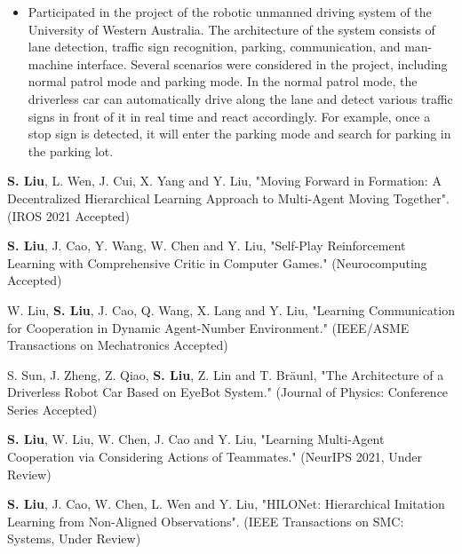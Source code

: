 {\small
  \begin{itemize}
    \item Participated in the project of the robotic unmanned driving system of the University of Western Australia. The architecture of the system consists of lane detection, traffic sign recognition, parking, communication, and man-machine interface. Several scenarios were considered in the project, including normal patrol mode and parking mode. In the normal patrol mode, the driverless car can automatically drive along the lane and detect various traffic signs in front of it in real time and react accordingly. For example, once a stop sign is detected, it will enter the parking mode and search for parking in the parking lot.
  \end{itemize}
}


\begin{itemize}[leftmargin=*]
  {\small
  \item
  \textbf{S. Liu}, L. Wen, J. Cui, X. Yang and Y. Liu, "Moving Forward in Formation: A Decentralized Hierarchical Learning Approach to Multi-Agent Moving Together". (IROS 2021 Accepted)
  \item
  \textbf{S. Liu}, J. Cao, Y. Wang, W. Chen and Y. Liu, "Self-Play Reinforcement Learning with Comprehensive Critic in Computer Games." (Neurocomputing Accepted)
  \item
  W. Liu, \textbf{S. Liu}, J. Cao, Q. Wang, X. Lang and Y. Liu, "Learning Communication for Cooperation in Dynamic Agent-Number Environment." (IEEE/ASME Transactions on Mechatronics Accepted)
  \item 
  S. Sun, J. Zheng, Z. Qiao, \textbf{S. Liu}, Z. Lin and T. Bräunl, "The Architecture of a Driverless Robot Car Based on EyeBot System." (Journal of Physics: Conference Series Accepted)
  \item
  \textbf{S. Liu}, W. Liu, W. Chen, J. Cao and Y. Liu, "Learning Multi-Agent Cooperation via Considering Actions of Teammates." (NeurIPS 2021, Under Review)}
  \item
  \textbf{S. Liu}, J. Cao, W. Chen, L. Wen and Y. Liu, "HILONet: Hierarchical Imitation Learning from Non-Aligned Observations". (IEEE Transactions on SMC: Systems, Under Review)

\end{itemize}